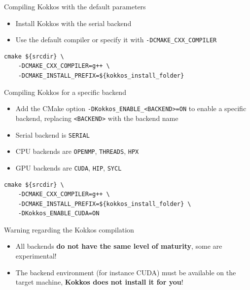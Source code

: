 \documentclass[aspectratio=169]{beamer}
\newcommand{\highlight}[1]{\textcolor{main}{\textbf{#1}}}
\begin{document}

\begin{frame}[fragile]{Compiling Kokkos with the default parameters}
    \begin{itemize}
        \item Install Kokkos with the serial backend
        \item Use the default compiler or specify it with \texttt{-DCMAKE\_CXX\_COMPILER}
    \end{itemize}
    \begin{verbatim}
cmake ${srcdir} \
    -DCMAKE_CXX_COMPILER=g++ \
    -DCMAKE_INSTALL_PREFIX=${kokkos_install_folder}
    \end{verbatim}
\end{frame}


\begin{frame}[fragile]{Compiling Kokkos for a specific backend}
    \begin{itemize}
        \item Add the CMake option \texttt{-DKokkos\_ENABLE\_<BACKEND>=ON} to enable a specific backend, replacing \texttt{<BACKEND>} with the backend name
        \item Serial backend is \texttt{SERIAL}
        \item CPU backends are \texttt{OPENMP}, \texttt{THREADS}, \texttt{HPX}
        \item GPU backends are \texttt{CUDA}, \texttt{HIP}, \texttt{SYCL}
    \end{itemize}
    \begin{verbatim}
cmake ${srcdir} \
    -DCMAKE_CXX_COMPILER=g++ \
    -DCMAKE_INSTALL_PREFIX=${kokkos_install_folder} \
    -DKokkos_ENABLE_CUDA=ON
    \end{verbatim}
\end{frame}


\begin{frame}{Warning regarding the Kokkos compilation}
    \begin{itemize}
        \item All backends \highlight{do not have the same level of maturity}, some are experimental!
        \item The backend environment (for instance CUDA) must be available on the target machine, \highlight{Kokkos does not install it for you}!
    \end{itemize}
\end{frame}
\end{document}
